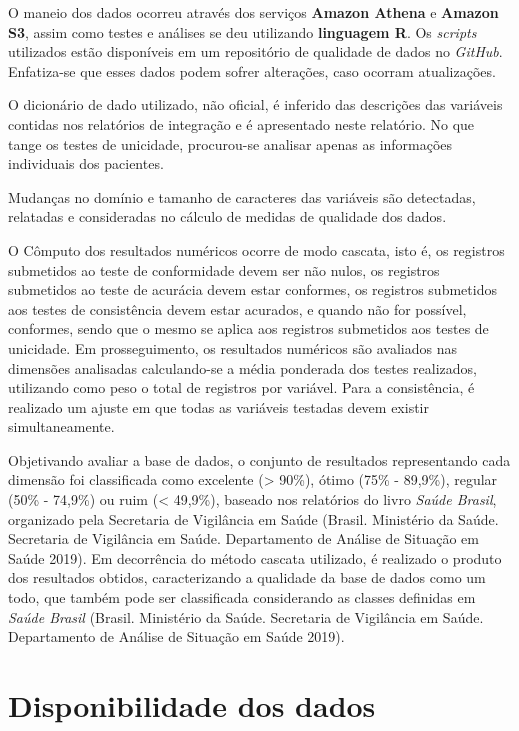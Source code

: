 \documentclass[
  12,
  table]{proadi}
\begin{document}
O maneio dos dados ocorreu através dos serviços \textbf{Amazon Athena} e
\textbf{Amazon S3}, assim como testes e análises se deu utilizando
\textbf{linguagem R}. Os \emph{scripts} utilizados estão disponíveis em
um repositório de qualidade de dados no \emph{GitHub}. Enfatiza-se que
esses dados podem sofrer alterações, caso ocorram atualizações.

O dicionário de dado utilizado, não oficial, é inferido das descrições
das variáveis contidas nos relatórios de integração e é apresentado
neste relatório. No que tange os testes de unicidade, procurou-se
analisar apenas as informações individuais dos pacientes.

Mudanças no domínio e tamanho de caracteres das variáveis são
detectadas, relatadas e consideradas no cálculo de medidas de qualidade
dos dados.

O Cômputo dos resultados numéricos ocorre de modo cascata, isto é, os
registros submetidos ao teste de conformidade devem ser não nulos, os
registros submetidos ao teste de acurácia devem estar conformes, os
registros submetidos aos testes de consistência devem estar acurados, e
quando não for possível, conformes, sendo que o mesmo se aplica aos
registros submetidos aos testes de unicidade. Em prosseguimento, os
resultados numéricos são avaliados nas dimensões analisadas
calculando-se a média ponderada dos testes realizados, utilizando como
peso o total de registros por variável. Para a consistência, é realizado
um ajuste em que todas as variáveis testadas devem existir
simultaneamente.

Objetivando avaliar a base de dados, o conjunto de resultados
representando cada dimensão foi classificada como excelente
(\textgreater{} 90\%), ótimo (75\% - 89,9\%), regular (50\% - 74,9\%) ou
ruim (\textless{} 49,9\%), baseado nos relatórios do livro \emph{Saúde
Brasil}, organizado pela Secretaria de Vigilância em Saúde (Brasil.
Ministério da Saúde. Secretaria de Vigilância em Saúde. Departamento de
Análise de Situação em Saúde 2019). Em decorrência do método cascata
utilizado, é realizado o produto dos resultados obtidos, caracterizando
a qualidade da base de dados como um todo, que também pode ser
classificada considerando as classes definidas em \emph{Saúde Brasil}
(Brasil. Ministério da Saúde. Secretaria de Vigilância em Saúde.
Departamento de Análise de Situação em Saúde 2019).

\hypertarget{disponibilidade-dos-dados}{%
\section{Disponibilidade dos dados}\label{disponibilidade-dos-dados}}
\end{document}
